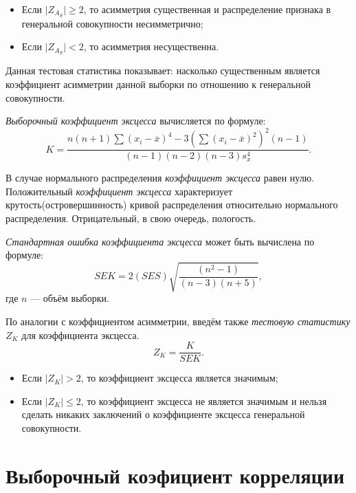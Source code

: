 \begin{itemize}
	\item Если $\vert Z_{A_S} \vert \ge 2$, то асимметрия существенная и распределение признака в генеральной совокупности несимметрично;
	\item Если $\vert Z_{A_S} \vert < 2$, то асимметрия несущественна.
\end{itemize}
Данная тестовая статистика показывает: насколько существенным является коэффициент асимметрии данной выборки по отношению к генеральной совокупности. 

\textit{Выборочный коэффициент эксцесса} вычисляется по формуле:
\begin{equation*}
	K = \frac{n(n + 1) \sum{(x_i - \overline{x})^4} - 3(\sum{(x_i - \overline{x})^2})^2 (n - 1)}{(n - 1)(n - 2)(n - 3)s_x^4}.
\end{equation*}

В случае нормального распределения \textit{коэффициент эксцесса} равен нулю. Положительный \textit{коэффициент эксцесса} характеризует крутость(островершинность) кривой распределения относительно нормального распределения. Отрицательный, в свою очередь, пологость.

\textit{Стандартная ошибка коэффициента эксцесса} может быть вычислена по формуле:
\begin{equation*}
	SEK = 2(SES) \sqrt{\frac{(n^2 - 1)}{(n - 3)(n + 5)}},
\end{equation*}
где $n$ --- объём выборки.

По аналогии с коэффициентом асимметрии, введём также \textit{тестовую статистику} $Z_K$ для коэффициента эксцесса.
\begin{equation*}
	Z_K = \frac{K}{SEK}.
\end{equation*}

\begin{itemize}
	\item Если $\vert Z_K \vert > 2$, то коэффициент эксцесса является значимым;
	\item Если $\vert Z_K \vert \le 2$, то коэффициент эксцесса не является значимым и нельзя сделать никаких заключений о коэффициенте эксцесса генеральной совокупности.
\end{itemize}


\section*{Выборочный коэфициент корреляции} %
\label{sec:correlation}

